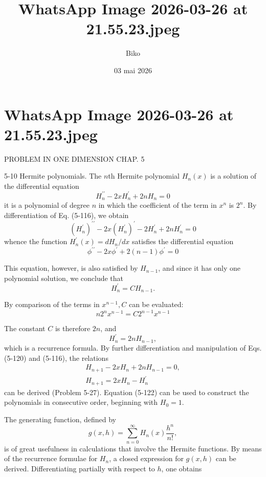 \documentclass[12pt,a4paper]{article}
\title{WhatsApp Image 2026-03-26 at 21.55.23.jpeg}
\author{Biko}
\date{03 mai 2026}
\begin{document}
\maketitle

\section*{WhatsApp Image 2026-03-26 at 21.55.23.jpeg}

PROBLEM IN ONE DIMENSION CHAP. 5

5-10 Hermite polynomials. The $n$th Hermite polynomial $H_{n}(x)$ is a solution of the differential equation
$$H_{n}^{\prime \prime}-2 x H_{n}^{\prime}+2 n H_{n}=0$$
it is a polynomial of degree $n$ in which the coefficient of the term in $x^{n}$ is $2^{n}$. By differentiation of Eq. (5-116), we obtain
$$\left(H_{n}^{\prime}\right)^{\prime \prime}-2 x\left(H_{n}^{\prime}\right)^{\prime}-2 H_{n}^{\prime}+2 n H_{n}^{\prime}=0$$
whence the function $H_{n}^{\prime}(x)=d H_{n} / d x$ satisfies the differential equation
$$\phi^{\prime \prime}-2 x \phi^{\prime}+2(n-1) \phi^{\prime}=0$$

This equation, however, is also satisfied by $H_{n-1}$, and since it has only one polynomial solution, we conclude that
$$H_{n}^{\prime}=C H_{n-1} .$$

By comparison of the terms in $x^{n-1}, C$ can be evaluated:
$$n 2^{n} x^{n-1}=C 2^{n-1} x^{n-1}$$

The constant $C$ is therefore $2 n$, and
$$H_{n}^{\prime}=2 n H_{n-1},$$
which is a recurrence formula. By further differentiation and manipulation of Eqs. (5-120) and (5-116), the relations
$$\begin{array}{c}
H_{n+1}-2 x H_{n}+2 n H_{n-1}=0, \\
H_{n+1}=2 x H_{n}-H_{n}^{\prime}
\end{array}$$
can be derived (Problem 5-27). Equation (5-122) can be used to construct the polynomials in consecutive order, beginning with $H_{0}=1$.

The generating function, defined by
$$g(x, h)=\sum_{n=0}^{\infty} H_{n}(x) \frac{h^{n}}{n!},$$
is of great usefulness in calculations that involve the Hermite functions. By means of the recurrence formulae for $H_{n}$, a closed expression for $g(x, h)$ can be derived. Differentiating partially with respect to $h$, one obtains
\end{document}

